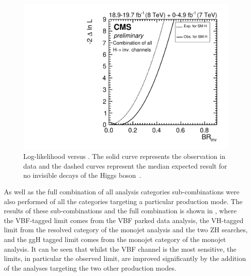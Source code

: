 \begin{figure}
  \includegraphics[width=\largefigwidth]{plots/comb/HIG-15-012-figs/combscan.pdf}
  \caption{Log-likelihood versus \BRinv. The solid curve represents the observation in data and the dashed curves represent the median expected result for no invisible decays of the Higgs boson~\cite{CMS-PAS-HIG-15-012}.}
  \label{fig:parkedcombscan}
\end{figure}

As well as the full combination of all analysis categories sub-combinations were also performed of all the categories targeting a particular production mode. The results of these sub-combinations and the full combination is shown in , where the \ac{VBF}-tagged limit comes from the \ac{VBF} parked data analysis, the \ac{VH}-tagged limit from the resolved category of the monojet analysis and the two ZH searches, and the \ac{ggH} tagged limit comes from the monojet category of the monojet analysis. It can be seen that whilst the \ac{VBF} channel is the most sensitive, the limits, in particular the observed limit, are improved significantly by the addition of the analyses targeting the two other production modes.

